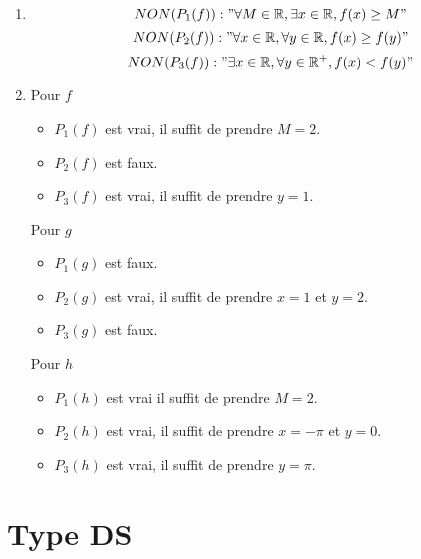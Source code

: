 \documentclass[a4paper, 11pt]{article}
\begin{document}
\begin{correction}
    \begin{enumerate}
        \item $$NON(P_1(f)) : "\forall M\in \mathbb{R}, \exists x \in \mathbb{R}, f(x) \geq M"$$
$$NON(P_2(f)) : "\forall x\in \mathbb{R}, \forall y \in \mathbb{R}, f(x) \geq f(y)"$$
$$NON(P_3(f)) : "\exists x\in \mathbb{R}, \forall y \in \mathbb{R}^+, f(x) < f(y)"$$
\item 
Pour $f$
\begin{itemize}
    \item  $P_1(f)$ est vrai, il suffit de prendre $M=2$.
    \item $P_2(f)$ est faux. 
    \item  $P_3(f)$ est vrai, il suffit de prendre $y=1$.
\end{itemize}

Pour $g$ 
\begin{itemize}
    \item  $P_1(g)$ est faux.
    \item $P_2(g)$ est vrai, il suffit de prendre $x=1$ et $y=2$.
    \item  $P_3(g)$ est faux.
\end{itemize}

Pour $h$

\begin{itemize}
    \item  $P_1(h)$ est vrai il suffit de prendre $M=2$. 
    \item  $P_2(h)$ est vrai, il suffit de prendre $x=-\pi$ et $y=0$.
    \item   $P_3(h)$ est vrai, il suffit de prendre $y=\pi$.
\end{itemize}

    \end{enumerate}
\end{correction}



\newpage
\section*{Type DS}
\end{document}
